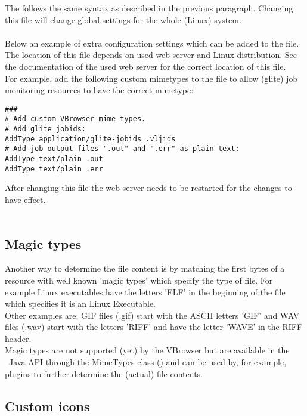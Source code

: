 The  follows the same syntax as described in the previous paragraph.
Changing this file will change global settings for the whole (Linux) system.\\  
\\
Below an example of extra configuration settings which can be added to the  file.
The location of this file depends on used web server and Linux distribution. 
See the documentation of the used web server for the correct location of this file.\\
For example, add the following custom mimetypes to the  file
to allow (glite) job monitoring resources to have the correct mimetype:\\
 
\begin{boxedlisting}
\begin{verbatim}
###
# Add custom VBrowser mime types. 
# Add glite jobids: 
AddType application/glite-jobids .vljids
# Add job output files ".out" and ".err" as plain text:  
AddType text/plain .out
AddType text/plain .err
\end{verbatim}
\end{boxedlisting}

After changing this file the web server needs to be restarted for the changes to have effect. 
\\ 
\\
\subsection{Magic types}
Another way to determine the file content is by matching the first bytes of a
resource with well known 'magic types' which specify the type of file. 
For example Linux executables have the letters 'ELF' in the beginning of 
the file which specifies it is an Linux Executable. \\
Other examples are: GIF files (.gif) start with the ASCII letters 'GIF' and 
WAV files (.wav) start with the letters 'RIFF' and have the letter 'WAVE' in the
RIFF header.
\\ Magic types are not supported (yet) by the VBrowser but are available in 
the \VLET\ Java API through the MimeTypes class 
()
and can be used by, for example, plugins to further determine the (actual) file
contents. 

\subsection{Custom icons}

